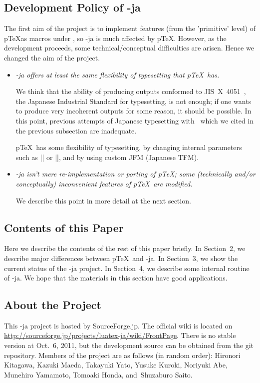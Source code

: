 \documentclass{ajt}
\begin{document}
\subsection{Development Policy of \LuaTeX-ja}
\label{ssec-pol} 
The first aim of the project is to implement features (from the
'primitive' level) of p\TeX as macros under \LuaTeX, so \LuaTeX-ja is
much affected by p\TeX.  However, as the development proceeds, some
technical/conceptual difficulties are arisen. Hence we changed the aim
of the project.
\begin{itemize}
\item\emph{\LuaTeX-ja offers at least the same flexibility of typesetting that
     p\TeX\ has.}

     We think that the ability of producing outputs conformed to
     JIS~X~4051~\cite{jisx4051}, the Japanese Industrial Standard for
     typesetting, is not enough; if one wants to produce very
     incoherent outputs for some reason, it should be possible. 
In this point, previous attempts of Japanese typesetting with \LuaTeX\
     which we cited in the previous subsection are inadequate.

p\TeX\ has some flexibility of typesetting, by changing internal
     parameters such as |\kanjiskip| or |\prebreakpenalty|, and by using
     custom JFM (Japanese TFM). 

\item\emph{\LuaTeX-ja isn't mere re-implementation or porting of p\TeX;
     some (technically and/or conceptually) inconvenient features of
     p\TeX\ are modified.} 

     We describe this point in more detail at the next section.
\end{itemize}


\subsection{Contents of this Paper}
Here we describe the contents of the rest of this paper briefly.  In
Section~2, we describe major differences between p\TeX\ and \LuaTeX-ja.
In Section~3, we show the current status of the \LuaTeX-ja project. In
Section~4, we describe some internal routine of \LuaTeX-ja.  We hope
that the materials in this section have good applications.

\subsection*{About the Project}
This \LuaTeX-ja project is hosted by SourceForge.jp. The official wiki
is located on
\url{http://sourceforge.jp/projects/luatex-ja/wiki/FrontPage}.  There is
no stable version at Oct.\ 6, 2011, but the development source can be
obtained from the git repository.  Members of the project are as follows
(in random order): Hironori Kitagawa, Kazuki Maeda, Takayuki Yato,
Yusuke Kuroki, Noriyuki Abe, Munehiro Yamamoto, Tomoaki Honda,
and~Shuzaburo Saito.
\end{document}
